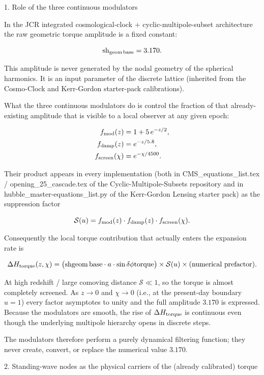 1. Role of the three continuous modulators

In the JCR integrated cosmological-clock + cyclic-multipole-subset architecture the raw geometric torque amplitude is a fixed constant:

\[
{\rm sh}_{\rm geom\,base} = 3.170.
\]

This amplitude is never generated by the nodal geometry of the spherical harmonics. It is an input parameter of the discrete lattice (inherited from the Cosmo-Clock and Kerr-Gordon starter-pack calibrations).  

What the three continuous modulators do is control the fraction of that already-existing amplitude that is visible to a local observer at any given epoch:

\[
\begin{align*}
f_{\rm mod}(z) &= 1 + 5\,e^{-z/2}, \\
f_{\rm damp}(z) &= e^{-z/5.8}, \\
f_{\rm screen}(\chi) &= e^{-\chi/4500}.
\end{align*}
\]

Their product appears in every implementation (both in CMS_equations_list.tex / opening_25_cascade.tex of the Cyclic-Multipole-Subsets repository and in hubble_master-equations_list.py of the Kerr-Gordon Lensing starter pack) as the suppression factor

\[
\mathcal{S}(u) = f_{\rm mod}(z)\cdot f_{\rm damp}(z)\cdot f_{\rm screen}(\chi).
\]

Consequently the local torque contribution that actually enters the expansion rate is

\[
\Delta H_{\rm torque}(z,\chi) = \bigl({\rm sh}{\rm geom\,base}\cdot a\cdot\sin\delta\phi{\rm torque}\bigr)\times\mathcal{S}(u)\times\text{(numerical prefactor)}.
\]

At high redshift / large comoving distance \(\mathcal{S}\ll 1\), so the torque is almost completely screened.  
As \(z\to 0\) and \(\chi\to 0\) (i.e., at the present-day boundary \(u=1\)) every factor asymptotes to unity and the full amplitude \(3.170\) is expressed.  
Because the modulators are smooth, the rise of \(\Delta H_{\rm torque}\) is continuous even though the underlying multipole hierarchy opens in discrete steps.

The modulators therefore perform a purely dynamical filtering function; they never create, convert, or replace the numerical value \(3.170\).

2. Standing-wave nodes as the physical carriers of the (already calibrated) torque

